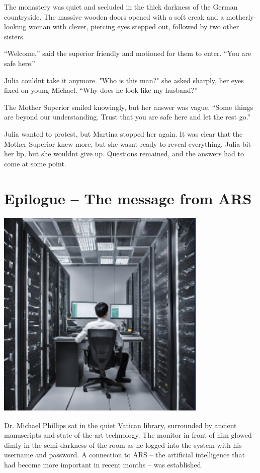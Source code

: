 \documentclass[
]{article}
\begin{document}
The monastery was quiet and secluded in the thick darkness of the German
countryside. The massive wooden doors opened with a soft creak and a
motherly-looking woman with clever, piercing eyes stepped out, followed
by two other sisters.

``Welcome,'' said the superior friendly and motioned for them to enter.
``You are safe here.''

Julia couldn\textquotesingle t take it anymore. "Who is this man?" she
asked sharply, her eyes fixed on young Michael. ``Why does he look like
my husband?''

The Mother Superior smiled knowingly, but her answer was vague. ``Some
things are beyond our understanding. Trust that you are safe here and
let the rest go.''

Julia wanted to protest, but Martina stopped her again. It was clear
that the Mother Superior knew more, but she wasn\textquotesingle t ready
to reveal everything. Julia bit her lip, but she
wouldn\textquotesingle t give up. Questions remained, and the answers
had to come at some point.

\section{Epilogue -- The message from
ARS}\label{epilogue-the-message-from-ars}

\includegraphics[width=3.9651in,height=3.9956in]{media/image14.png}

Dr. Michael Phillips sat in the quiet Vatican library, surrounded by
ancient manuscripts and state-of-the-art technology. The monitor in
front of him glowed dimly in the semi-darkness of the room as he logged
into the system with his username and password. A connection to ARS --
the artificial intelligence that had become more important in recent
months -- was established.
\end{document}
